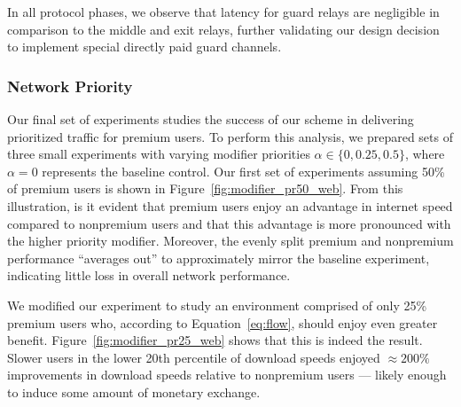 In all protocol phases, we observe that latency for guard relays are negligible
in comparison to the middle and exit relays, further validating our design
decision to implement special directly paid guard channels.

\subsubsection{Network Priority}
\label{sec:priority_exp}

Our final set of experiments studies the success of our scheme in delivering
prioritized traffic for premium users. To perform this analysis, we prepared
sets of three small experiments with varying modifier priorities
$\alpha \in \{0, 0.25, 0.5\}$, where $\alpha = 0$ represents the baseline
control. Our first set of experiments assuming 50\% of premium users is shown in
Figure~\ref{fig:modifier_pr50_web}. From this illustration, is it evident that
premium users enjoy an advantage in internet speed compared to nonpremium users
and that this advantage is more pronounced with the higher priority
modifier. Moreover, the evenly split premium and nonpremium performance
``averages out'' to approximately mirror the baseline experiment, indicating
little loss in overall network performance.

We modified our experiment to study an environment comprised of only 25\%
premium users who, according to Equation~\ref{eq:flow}, should enjoy even
greater benefit. Figure~\ref{fig:modifier_pr25_web} shows that this is indeed the
result. Slower users in the lower 20th percentile of download speeds enjoyed
$\approx 200\%$ improvements in download speeds relative to nonpremium users ---
likely enough to induce some amount of monetary exchange.

